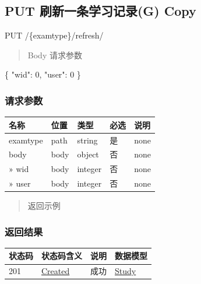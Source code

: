 \documentclass[
]{article}
\newenvironment{Shaded}{}{}
\newcommand{\DataTypeTok}[1]{\textcolor[rgb]{0.56,0.13,0.00}{#1}}
\newcommand{\DecValTok}[1]{\textcolor[rgb]{0.25,0.63,0.44}{#1}}
\newcommand{\FunctionTok}[1]{\textcolor[rgb]{0.02,0.16,0.49}{#1}}
\begin{document}
\hypertarget{put-ux5237ux65b0ux4e00ux6761ux5b66ux4e60ux8bb0ux5f55g--copy}{%
\subsection{PUT 刷新一条学习记录(G)
Copy}\label{put-ux5237ux65b0ux4e00ux6761ux5b66ux4e60ux8bb0ux5f55g--copy}}

PUT /\{examtype\}/refresh/

\begin{quote}
Body 请求参数
\end{quote}

\begin{Shaded}
\begin{Highlighting}[]
\FunctionTok{\{}
  \DataTypeTok{"wid"}\FunctionTok{:} \DecValTok{0}\FunctionTok{,}
  \DataTypeTok{"user"}\FunctionTok{:} \DecValTok{0}
\FunctionTok{\}}
\end{Highlighting}
\end{Shaded}

\hypertarget{ux8bf7ux6c42ux53c2ux6570-9}{%
\subsubsection{请求参数}\label{ux8bf7ux6c42ux53c2ux6570-9}}

\begin{longtable}[]{@{}lllll@{}}
\toprule
名称 & 位置 & 类型 & 必选 & 说明 \\
\midrule
\endhead
examtype & path & string & 是 & none \\
body & body & object & 否 & none \\
» wid & body & integer & 否 & none \\
» user & body & integer & 否 & none \\
\bottomrule
\end{longtable}

\begin{quote}
返回示例
\end{quote}

\hypertarget{ux8fd4ux56deux7ed3ux679c-9}{%
\subsubsection{返回结果}\label{ux8fd4ux56deux7ed3ux679c-9}}

\begin{longtable}[]{@{}llll@{}}
\toprule
状态码 & 状态码含义 & 说明 & 数据模型 \\
\midrule
\endhead
201 & \href{https://tools.ietf.org/html/rfc7231\#section-6.3.2}{Created}
& 成功 & \protect\hyperlink{schemastudy}{Study} \\
\bottomrule
\end{longtable}
\end{document}
